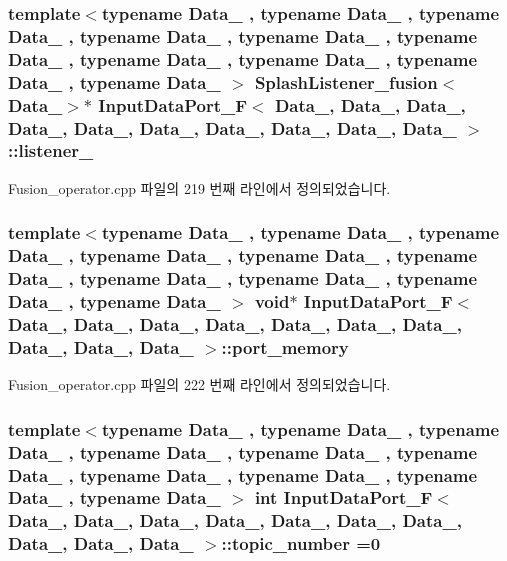 \subsubsection[{\texorpdfstring{listener\+\_\+8}{listener_8}}]{\setlength{\rightskip}{0pt plus 5cm}template$<$typename Data\+\_ , typename Data\+\_ , typename Data\+\_ , typename Data\+\_ , typename Data\+\_ , typename Data\+\_ , typename Data\+\_ , typename Data\+\_ , typename Data\+\_ , typename Data\+\_ $>$ {\bf Splash\+Listener\+\_\+fusion}$<$Data\+\_$>$$\ast$ {\bf Input\+Data\+Port\+\_\+F}$<$ Data\+\_, Data\+\_, Data\+\_, Data\+\_, Data\+\_, Data\+\_, Data\+\_, Data\+\_, Data\+\_, Data\+\_ $>$\+::listener\+\_}\hypertarget{classInputDataPort__F_a8af8e7aa880396f0945052e5cfc1985b}{}\label{classInputDataPort__F_a8af8e7aa880396f0945052e5cfc1985b}


Fusion\+\_\+operator.\+cpp 파일의 219 번째 라인에서 정의되었습니다.

\subsubsection[{\texorpdfstring{port\+\_\+memory}{port_memory}}]{\setlength{\rightskip}{0pt plus 5cm}template$<$typename Data\+\_ , typename Data\+\_ , typename Data\+\_ , typename Data\+\_ , typename Data\+\_ , typename Data\+\_ , typename Data\+\_ , typename Data\+\_ , typename Data\+\_ , typename Data\+\_ $>$ void$\ast$ {\bf Input\+Data\+Port\+\_\+F}$<$ Data\+\_, Data\+\_, Data\+\_, Data\+\_, Data\+\_, Data\+\_, Data\+\_, Data\+\_, Data\+\_, Data\+\_ $>$\+::port\+\_\+memory}\hypertarget{classInputDataPort__F_ab79e16d625d49923eb7e3864f8b2359e}{}\label{classInputDataPort__F_ab79e16d625d49923eb7e3864f8b2359e}


Fusion\+\_\+operator.\+cpp 파일의 222 번째 라인에서 정의되었습니다.

\subsubsection[{\texorpdfstring{topic\+\_\+number}{topic_number}}]{\setlength{\rightskip}{0pt plus 5cm}template$<$typename Data\+\_ , typename Data\+\_ , typename Data\+\_ , typename Data\+\_ , typename Data\+\_ , typename Data\+\_ , typename Data\+\_ , typename Data\+\_ , typename Data\+\_ , typename Data\+\_ $>$ int {\bf Input\+Data\+Port\+\_\+F}$<$ Data\+\_, Data\+\_, Data\+\_, Data\+\_, Data\+\_, Data\+\_, Data\+\_, Data\+\_, Data\+\_, Data\+\_ $>$\+::topic\+\_\+number =0}\hypertarget{classInputDataPort__F_aa3975f3abd074e8fb18f34a4806d1f85}{}\label{classInputDataPort__F_aa3975f3abd074e8fb18f34a4806d1f85}


